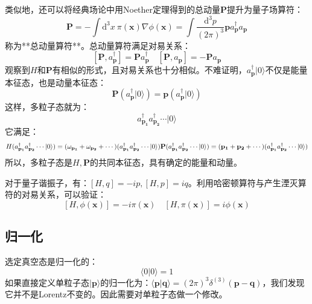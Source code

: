 \documentclass{book}
\begin{document}
类似地，还可以将经典场论中用Noether定理得到的总动量$\mathbf{P}$提升为量子场算符：
$$
\mathbf{P}=-\int \mathrm{d}^3x\mathrm{~}\pi(\mathbf{x})\nabla\phi(\mathbf{x})=\int\frac{\mathrm{d}^3p}{(2\pi)^3}\mathbf{p}a_\mathbf{p}^\dagger a_\mathbf{p}
$$
称为**总动量算符**。总动量算符满足对易关系：
$$
[\mathbf{P},a_\mathbf{p}^\dagger]=\mathbf{P}a_\mathbf{p}^\dagger \quad [\mathbf{P},a_\mathbf{p}]=-\mathbf{P}a_\mathbf{p}
$$
观察到$H$和$\mathbf{P}$有相似的形式，且对易关系也十分相似。不难证明，$a_\mathbf{p}^\dagger|0\rangle$不仅是能量本征态，也是动量本征态：
$$
\mathbf{P}(a^\dagger_{\mathbf{p}}|0\rangle)=\mathbf{p}(a^\dagger_{\mathbf{p}}|0\rangle)
$$
这样，多粒子态就为：
$$
a_{\mathbf{p_1}}^\dagger a_{\mathbf{p_2}}^\dagger\cdots|0\rangle
$$
它满足：
$$
H(a_{\mathbf{p_1}}^\dagger a_{\mathbf{p_2}}^\dagger\cdots|0\rangle)=(\omega_{\mathbf{p_1}}+\omega_{\mathbf{p_2}}+\cdots)(a_{\mathbf{p_1}}^\dagger a_{\mathbf{p_2}}^\dagger\cdots|0\rangle)
\\
\mathbf{P}(a_{\mathbf{p_1}}^\dagger a_{\mathbf{p_2}}^\dagger\cdots|0\rangle)=(\mathbf{p_1}+\mathbf{p_2}+\cdots)(a_{\mathbf{p_1}}^\dagger a_{\mathbf{p_2}}^\dagger\cdots|0\rangle)
$$
所以，多粒子态是$H,\mathbf{P}$的共同本征态，具有确定的能量和动量。

对于量子谐振子，有：$[H,q]=-ip,[H,p]=iq$。利用哈密顿算符与产生湮灭算符的对易关系，可以验证：
$$
[H,\phi(\mathbf{x})]=-i\pi(\mathbf{x})\quad [H,\pi(\mathbf{x})]=i\phi(\mathbf{x})
$$
\subsection{归一化}
选定真空态是归一化的：
$$
\langle 0| 0\rangle=1
$$
如果直接定义单粒子态$|\mathbf{p}\rangle$的归一化为：$\langle \mathbf{p}|\mathbf{q}\rangle=(2\pi)^3\delta^{(3)}(\mathbf{p}-\mathbf{q})$，我们发现它并不是Lorentz不变的。因此需要对单粒子态做一个修改。
\end{document}
